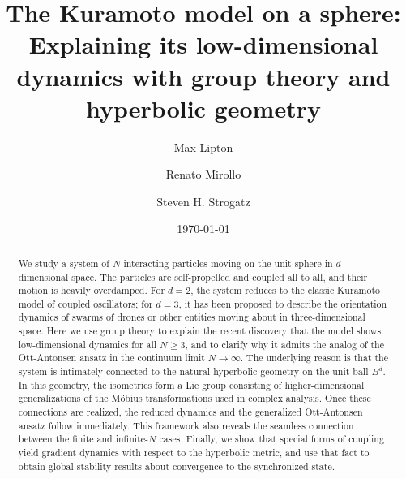 \documentclass[%
 aip,
 amsmath,amssymb,
 reprint,%
]{revtex4-1}
\begin{document}

\title[Kuramoto model on a sphere] {The Kuramoto model on a sphere: Explaining its low-dimensional dynamics with group theory and hyperbolic geometry}

\author{Max Lipton}
\author{Renato Mirollo}%
%

\author{Steven H. Strogatz}
%

\date{\today}%

\begin{abstract}
We study a system of $N$ interacting particles moving on the unit sphere in $d$-dimensional space. The particles are self-propelled and coupled all to all, and their motion is heavily overdamped. For $d=2$, the system reduces to the classic Kuramoto model of coupled oscillators; for $d=3$, it has been proposed to describe the orientation dynamics of swarms of drones or other entities moving about in three-dimensional space. Here we use group theory to explain the recent discovery that the model shows low-dimensional dynamics for all $N \ge 3$, and to clarify why it admits the analog of the Ott-Antonsen ansatz in the continuum limit $N \rightarrow \infty$. The underlying reason is that the system is intimately connected to the natural hyperbolic geometry on the unit ball $B^d$. In this geometry, the isometries form a Lie group consisting of higher-dimensional generalizations of the Möbius transformations used in complex analysis. Once these connections are realized, the reduced dynamics and the generalized Ott-Antonsen ansatz  follow immediately. This framework also reveals the seamless connection between the finite and infinite-$N$ cases. Finally, we show that special forms of coupling yield gradient dynamics with respect to the hyperbolic metric, and use that fact to obtain global stability results about convergence to the synchronized state.
\end{abstract}
\end{document}
